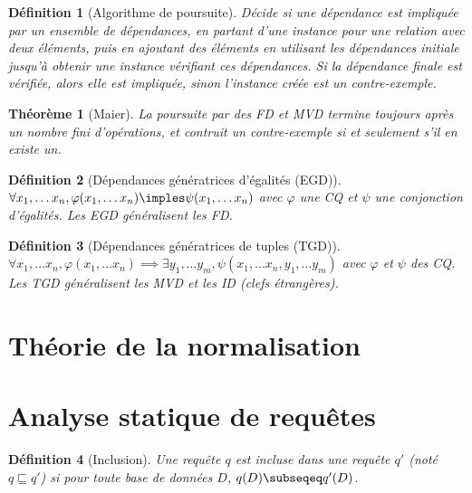 \documentclass[landscape]{article}
\newcommand{\1}{\mathbbm{1}}
\renewcommand{\phi}{\varphi}
\newtheorem{theo}{Théorème}
\newtheorem{defi}{Définition}
\begin{document}
\begin{multicols}{2}
    \begin{defi}[Algorithme de poursuite]
        Décide si une dépendance est impliquée par un ensemble de dépendances, en
        partant d'une instance pour une relation avec deux éléments, puis en ajoutant
        des éléments en utilisant les dépendances initiale jusqu'à obtenir une instance
        vérifiant ces dépendances. Si la dépendance finale est vérifiée, alors
        elle est impliquée, sinon l'instance créée est un contre-exemple.
    \end{defi}

    \begin{theo}[Maier]
        La poursuite par des FD et MVD termine toujours après un nombre fini
        d'opérations, et contruit un contre-exemple si et seulement s'il en
        existe un.
    \end{theo}

    \begin{defi}[Dépendances génératrices d'égalités (EGD)]
        $\forall x_1,\ldots x_n, \phi(x_1,\ldots x_n)\imples \psi(x_1,\ldots x_n)$
        avec $\phi$ une CQ et $\psi$ une conjonction d'égalités. Les EGD généralisent
        les FD.
    \end{defi}

    \begin{defi}[Dépendances génératrices de tuples (TGD)]
        $\forall x_1,\ldots x_n, \phi(x_1,\ldots x_n)\implies\exists y_1,\ldots y_m, \psi(x_1,\ldots x_n, y_1, \ldots y_m)$
        avec $\phi$ et $\psi$ des CQ. Les TGD généralisent les MVD et les ID
        (clefs étrangères).
    \end{defi}


    \section{Théorie de la normalisation}
    

    \section{Analyse statique de requêtes}

    \begin{defi}[Inclusion]
        Une requête $q$ est incluse dans une requête $q'$ (noté $q\sqsubseteq q'$)
        si pour toute base de données $D$, $q(D)\subseqeq q'(D)$.
    \end{defi}


\end{multicols}
\end{document}

